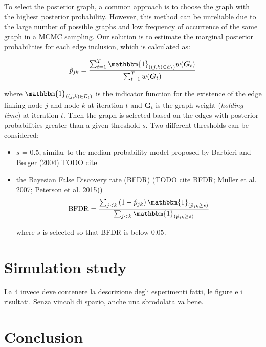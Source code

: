 To select the posterior graph, a common approach is to choose the graph with the highest posterior probability. However, this method can be unreliable due to the large number of possible graphs and low frequency of occurrence of the same graph in a MCMC sampling. Our solution is to estimate the marginal posterior probabilities for each edge inclusion, which is calculated as:

$$\hat{p}_{j k}=\frac{\sum_{t=1}^T \mathbbm{1}_{((j, k) \in E_t)} w(\boldsymbol{G}_t)}{\sum_{t=1}^T w(\boldsymbol{G}_t)}$$

where $\mathbbm{1}_{\left((j, k) \in E_t\right)}$ is the indicator function for the existence of the edge linking node $j$ and node $k$ at iteration $t$ and $\boldsymbol{G}_t$ is the graph weight (\emph{holding time}) at iteration $t$.
Then the graph is selected based on the edges with posterior probabilities greater than a given threshold $s$. 
Two different thresholds can be considered:
\begin{itemize}
    \item  $s$ = 0.5, similar to the median probability model proposed by Barbieri and Berger (2004) TODO cite
    \item the Bayesian False Discovery rate (BFDR) (TODO cite BFDR; Müller et al. 2007; Peterson et al. 2015))
$$\operatorname{BFDR}=\frac{\sum_{j<k}\left(1-\hat{p}_{j k}\right) \mathbbm{1}_{\left(\hat{p}_{j k} \geq s\right)}}{\sum_{j<k} \mathbbm{1}_{\left(\hat{p}_{j k} \geq s\right)}}$$

where $s$ is selected so that BFDR is below $0.05$.

\end{itemize}

\section{Simulation study}

La 4 invece deve contenere la descrizione degli esperimenti fatti, le figure e i risultati. Senza vincoli di spazio, anche una sbrodolata va bene.


\section{Conclusion}

